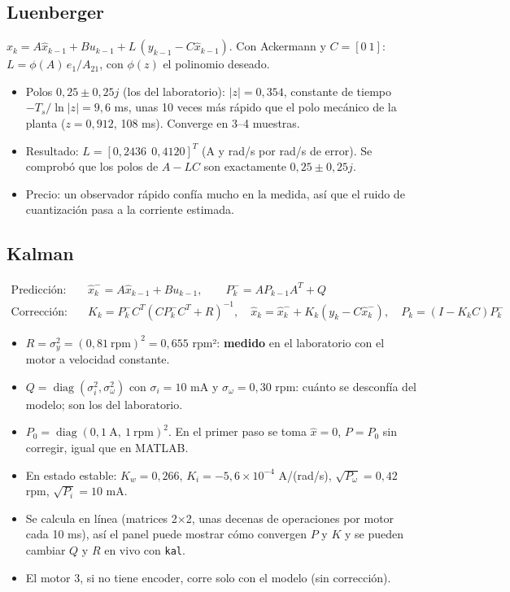 \documentclass[11pt]{article}
\newcommand{\cod}[1]{\texttt{#1}}
\begin{document}
\subsection*{Luenberger}
$\hat x_k=A\hat x_{k-1}+Bu_{k-1}+L\,(y_{k-1}-C\hat x_{k-1})$. Con Ackermann y $C=[0\ 1]$: $L=\phi(A)\,e_1/A_{21}$, con $\phi(z)$ el polinomio deseado.
\begin{itemize}
  \item Polos $0{,}25\pm0{,}25j$ (los del laboratorio): $|z|=0{,}354$, constante de tiempo $-T_s/\ln|z|=9{,}6$ ms, unas 10 veces más rápido que el polo mecánico de la planta ($z=0{,}912$, 108 ms). Converge en 3--4 muestras.
  \item Resultado: $L=[0{,}2436\ \ 0{,}4120]^T$ (A y rad/s por rad/s de error). Se comprobó que los polos de $A-LC$ son exactamente $0{,}25\pm0{,}25j$.
  \item Precio: un observador rápido confía mucho en la medida, así que el ruido de cuantización pasa a la corriente estimada.
\end{itemize}

\subsection*{Kalman}
\begin{align}
\text{Predicción:}\quad & \hat x^-_k=A\hat x_{k-1}+Bu_{k-1}, \qquad P^-_k=AP_{k-1}A^T+Q\\
\text{Corrección:}\quad & K_k=P^-_kC^T(CP^-_kC^T+R)^{-1},\quad \hat x_k=\hat x^-_k+K_k(y_k-C\hat x^-_k),\quad P_k=(I-K_kC)P^-_k
\end{align}
\begin{itemize}
  \item $R=\sigma_y^2=(0{,}81\ \text{rpm})^2=0{,}655$ rpm²: \textbf{medido} en el laboratorio con el motor a velocidad constante.
  \item $Q=\operatorname{diag}(\sigma_i^2,\sigma_\omega^2)$ con $\sigma_i=10$ mA y $\sigma_\omega=0{,}30$ rpm: cuánto se desconfía del modelo; son los del laboratorio.
  \item $P_0=\operatorname{diag}(0{,}1\ \text{A},\ 1\ \text{rpm})^2$. En el primer paso se toma $\hat x=0$, $P=P_0$ sin corregir, igual que en MATLAB.
  \item En estado estable: $K_w=0{,}266$, $K_i=-5{,}6\times10^{-4}$ A/(rad/s), $\sqrt{P_\omega}=0{,}42$ rpm, $\sqrt{P_i}=10$ mA.
  \item Se calcula en línea (matrices 2×2, unas decenas de operaciones por motor cada 10 ms), así el panel puede mostrar cómo convergen $P$ y $K$ y se pueden cambiar $Q$ y $R$ en vivo con \cod{kal}.
  \item El motor 3, si no tiene encoder, corre solo con el modelo (sin corrección).
\end{itemize}
\end{document}
